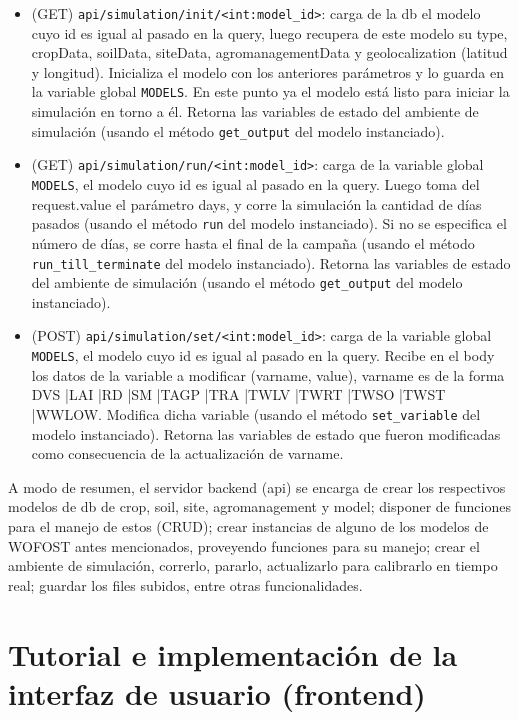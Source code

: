\begin{itemize}
	\item (GET) \lstinline|api/simulation/init/<int:model_id>|: carga de la db el modelo cuyo id es igual al pasado en la query, luego recupera de este modelo su type, cropData, soilData, siteData, agromanagementData y geolocalization (latitud y longitud). Inicializa el modelo con los anteriores parámetros y lo guarda en la variable global \lstinline|MODELS|. En este punto ya el modelo está listo para iniciar la simulación en torno a él. Retorna las variables de estado del ambiente de simulación (usando el método \lstinline|get_output| del modelo instanciado).
	\item (GET) \lstinline|api/simulation/run/<int:model_id>|: carga de la variable global \lstinline|MODELS|, el modelo cuyo id es igual al pasado en la query. Luego toma del request.value el parámetro days, y corre la simulación la cantidad de días pasados (usando el método \lstinline|run| del modelo instanciado). Si no se especifica el número de días, se corre hasta el final de la campaña (usando el método \lstinline|run_till_terminate| del modelo instanciado). Retorna las variables de estado del ambiente de simulación (usando el método \lstinline|get_output| del modelo instanciado).
	\item (POST) \lstinline|api/simulation/set/<int:model_id>|: carga de la variable global \lstinline|MODELS|, el modelo cuyo id es igual al pasado en la query. Recibe en el body los datos de la variable a modificar (varname, value), varname es de la forma DVS |LAI |RD |SM |TAGP |TRA |TWLV |TWRT |TWSO |TWST |WWLOW.
	Modifica dicha variable (usando el método \lstinline|set_variable| del modelo instanciado). Retorna las variables de estado que fueron modificadas como consecuencia de la actualización de varname.
\end{itemize}

A modo de resumen, el servidor backend (api) se encarga de crear los respectivos modelos de db de crop, soil, site, agromanagement y model; disponer de funciones para el manejo de estos (CRUD); crear instancias de alguno de los modelos de WOFOST antes mencionados, proveyendo funciones para su manejo; crear el ambiente de simulación, correrlo, pararlo, actualizarlo para calibrarlo en tiempo real; guardar los files subidos, entre otras funcionalidades.

\section{Tutorial e implementación de la interfaz de usuario (frontend)} \label{chapter:implementation:frontend}

